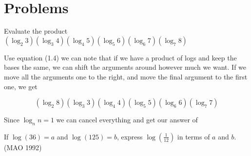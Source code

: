 \hfuzz=100pt 




\section{Problems}


\begin{question}

Evaluate the product $(\log_2{3})(\log_3{4})(\log_4{5})(\log_5{6})(\log_6{7})(\log_7{8})$

\end{question}

\begin{solution}

Use equation (1.4) we can note that if we have a product of logs and keep the bases the same, we can shift the arguments around however much we want. If we move all the arguments one to the right, and move the final argument to the first one, we get

$$(\log_2{8})(\log_3{3})(\log_4{4})(\log_5{5})(\log_6{6})(\log_7{7})$$

Since $\log_n{n} = 1$ we can cancel everything and get our answer of  

\end{solution}


\begin{question}

If $\log(36) = a$ and $\log(125) = b$, express $\log(\frac{1}{12})$ in terms of $a$ and $b$. (MAO 1992)

\end{question}

